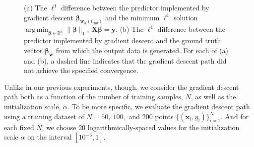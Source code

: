 \documentclass{article}
\DeclareMathOperator*{\argmin}{arg\,min}
\begin{document}
\begin{figure}[H]
    \centering
    \hfill
    \caption{(a) The $\ell^1$ difference between the predictor implemented by gradient descent $\boldsymbol{\beta}_{\boldsymbol{w}_{\alpha}(t_{\text{end}})}$ and the minimum $\ell^1$ solution $\argmin_{\boldsymbol{\beta} \in \mathbb{R}^n} \| \boldsymbol{\beta} \|_1, \ \boldsymbol{X} \boldsymbol{\beta} = \boldsymbol{y}$. (b) The $\ell^1$ difference between the predictor implemented by gradient descent and the ground truth vector $\boldsymbol{\beta}_{\boldsymbol{w}}$ from which the output data is generated. For each of (a) and (b), a dashed line indicates that the gradient descent path did not achieve the specified convergence.}\label{fig:l1error}
\end{figure}

Unlike in our previous experiments, though, we consider the gradient descent path both as a function of the number of training samples, $N$, as well as the initialization scale, $\alpha$. To be more specific, we evaluate the gradient descent path using a training dataset of $N = 50, \ 100,$ and $200$ points $\{ (\boldsymbol{x}_i, y_i) \}_{i=1}^N$. And for each fixed $N$, we choose $20$ logarithmically-spaced values for the initialization scale $\alpha$ on the interval $[10^{-3}, 1]$.
\end{document}
